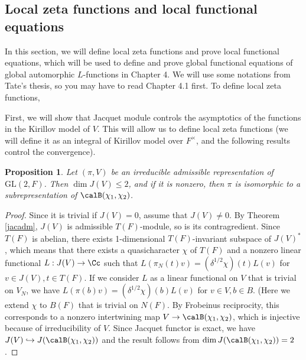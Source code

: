 \documentclass{article}
\newcommand{\GL}{\mathrm{GL}}
\newtheorem{proposition}{Proposition}[section]
\begin{document}
\subsection{Local zeta functions and local functional equations}
In this section, we will define local zeta functions and prove local functional equations, which will be used to define and prove global functional equations of global automorphic $L$-functions in Chapter 4. 
We will use some notations from Tate's thesis, so you may have to read Chapter 4.1 first. 
To define local zeta functions, 


First, we will show that Jacquet module controls the asymptotics of the functions in the Kirillov model of $V$. 
This will allow us to define local zeta functions (we will define it as an integral of Kirillov model over $F^{\times}$, and the following results control the convergence).

\begin{proposition}
\label{jacdim2}
Let $(\pi, V)$ be an irreducible admissible representation of $\GL(2, F)$. Then $\dim J(V) \leq 2$, and if it is nonzero, then $\pi$ is isomorphic to a subrepresentation of $\calB(\chi_1, \chi_2)$. 
\end{proposition}
\begin{proof}
Since it is trivial if $J(V) = 0$, assume that $J(V) \neq 0$. 
By Theorem \ref{jacadm}, $J(V)$ is admissible $T(F)$-module, so is its contragredient. 
Since $T(F)$ is abelian, there exists 1-dimensional $T(F)$-invariant subspace of $J(V)^{*}$, which means that there exists a quasicharacter $\chi$ of $T(F)$ and a nonzero linear functional $L:J(V)\to \Cc$ such that $L(\pi_{N}(t)v) = (\delta^{1/2}\chi)(t)L(v)$ for $v\in J(V), t\in T(F)$. 
If we consider $L$ as a linear functional on $V$ that is trivial on $V_N$, we have $L(\pi(b)v) = (\delta^{1/2}\chi)(b)L(v)$ for $v\in V, b\in B$. (Here we extend $\chi$ to $B(F)$ that is trivial on $N(F)$. 
By Frobeinus reciprocity, this corresponds to a nonzero intertwining map $V \to \calB(\chi_1, \chi_2)$, which is injective because of irreducibility of $V$. 
Since Jacquet functor is exact, we have $J(V)\hookrightarrow J(\calB(\chi_1, \chi_2))$ and the result follows from $\dim J(\calB(\chi_1, \chi_2)) = 2$. 
\end{proof}
\end{document}
